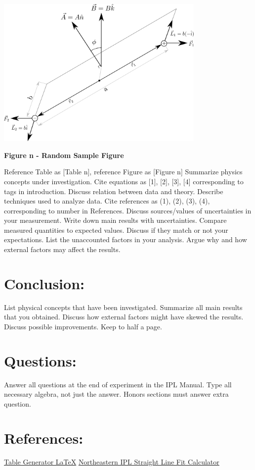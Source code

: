 \documentclass[12pt]{article}
\begin{document}
\begin{outline}[enumerate]
		\begin{center}
			\includegraphics[width=4in]{RandFigure}\\
			\begin{small} \textbf{
				Figure n - Random Sample Figure
			} \end{small}
		\end{center}
				\2 Reference Table as [Table n], reference Figure as [Figure n]
			\1 Summarize physics concepts under investigation.
				\2 Cite equations as [1], [2], [3], [4] corresponding to tags in introduction.
			\1 Discuss relation between data and theory.
		 	\1 Describe techniques used to analyze data.
		 		\2 Cite references as (1), (2), (3), (4), corresponding to number in References.
		 	\1 Discuss sources/values of uncertainties in your measurement.
			\1 Write down main results with uncertainties.
			\1 Compare measured quantities to expected values.
			\1 Discuss if they match or not your expectations.
			\1 List the unaccounted factors in your analysis.
			\1 Argue why and how external factors may affect the results.\\
		\end{outline}
		
	\section*{Conclusion:}
		\begin{outline}[enumerate]
			\1 List physical concepts that have been investigated.
			\1 Summarize all main results that you obtained.
		 	\1 Discuss how external factors might have skewed the results.
			\1 Discuss possible improvements.
			\1 Keep to half a page.
		\end{outline}
		
	\section*{Questions:}
		\begin{outline}[enumerate]
			\1 Answer all questions at the end of experiment in the IPL Manual.
			\1 Type all necessary algebra, not just the answer.
			\1 Honors sections must answer extra question.
		\end{outline}
		
	\section*{References:}
		\begin{outline}[enumerate]
			\1 \href{https://www.tablesgenerator.com/#}{Table Generator \LaTeX}
			\1 \href{https://web.northeastern.edu/ipl/data-analysis/straight-line-fit/}{Northeastern IPL Straight Line Fit Calculator}
		\end{outline}
		
\end{document}

